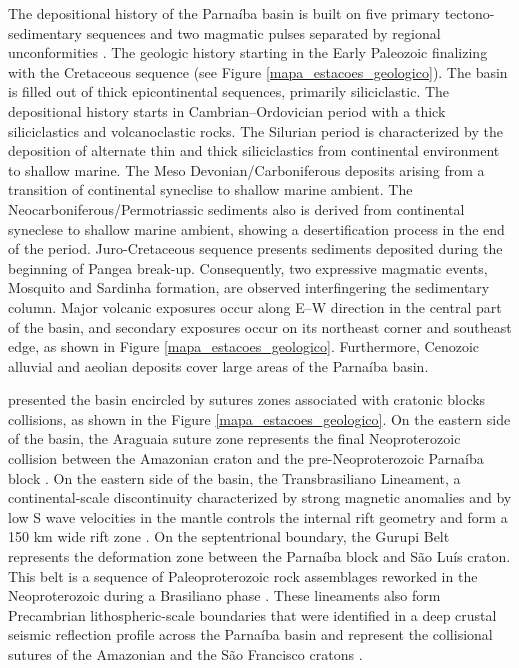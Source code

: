 \documentclass[paper,11pt]{geophysics}
\begin{document}
The depositional history of the Parnaíba basin is built on five primary tectono-sedimentary sequences and two magmatic pulses separated by regional unconformities \citep{goes_feijo_1994, vaz_bacia_2007}. The geologic history starting in the Early Paleozoic finalizing with the Cretaceous sequence (see Figure \ref{mapa_estacoes_geologico}). The basin is filled out of thick epicontinental sequences, primarily siliciclastic. The depositional history starts in Cambrian–Ordovician period with a thick siliciclastics and volcanoclastic rocks. The Silurian period is characterized by the deposition of alternate thin and thick siliciclastics from continental environment to shallow marine. The Meso Devonian/Carboniferous deposits arising from a transition of continental syneclise to shallow marine ambient. The Neocarboniferous/Permotriassic sediments also is derived from continental syneclese to shallow marine ambient, showing a desertification process in the end of the period. Juro-Cretaceous sequence presents sediments deposited during the beginning of Pangea break-up. Consequently, two expressive magmatic events, Mosquito and Sardinha formation, are observed interfingering the sedimentary column. Major volcanic exposures occur along E–W direction in the central part of the basin, and secondary exposures occur on its northeast corner and southeast edge, as shown in Figure \ref{mapa_estacoes_geologico}. Furthermore, Cenozoic alluvial and aeolian deposits cover large areas of the Parnaíba basin. 

\cite{cordani_significance_2013,daly_brasiliano_2014, de_castro_crustal_2014} presented the basin encircled by sutures zones associated with cratonic blocks collisions, as shown in the Figure \ref{mapa_estacoes_geologico}. On the eastern side of the basin, the Araguaia suture zone represents the final Neoproterozoic collision between the Amazonian craton and the pre-Neoproterozoic Parnaíba block \citep{fuck_rodinia_2008,brito_neves_basement_2014}. On the eastern side of the basin, the Transbrasiliano Lineament, a continental-scale discontinuity characterized by strong magnetic anomalies and by low S wave velocities in the mantle controls the internal rift geometry and form a 150 km wide rift zone \citep{fairhead_champ_2003,feng_group_velocity_2004,brito_neves_basement_2014}. On the septentrional boundary, the Gurupi Belt represents the deformation zone between the Parnaíba block and São Luís craton. This belt is a sequence of Paleoproterozoic rock assemblages reworked in the Neoproterozoic during a Brasiliano phase \citep{klein_gurupi_2005}. These lineaments also form Precambrian lithospheric-scale boundaries that were identified in a deep crustal seismic reflection profile across the Parnaíba basin and represent the collisional sutures of the Amazonian and the São Francisco cratons \citep{daly_brasiliano_2014,de_castro_crustal_2014}.
\end{document}
